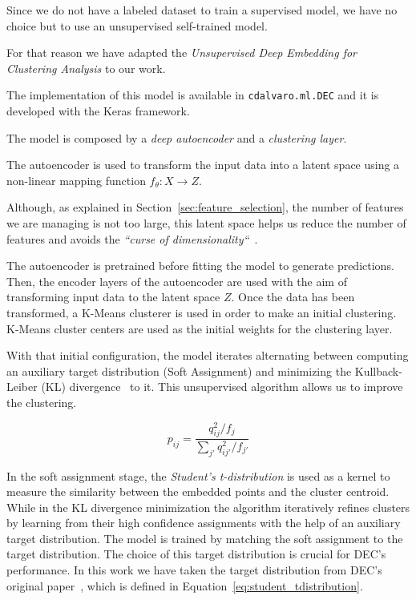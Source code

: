 \documentclass[11pt, a4paper, english]{book}
\begin{document}
Since we do not have a labeled dataset to train a supervised model,
we have no choice but to use an unsupervised self-trained model.

For that reason we have adapted the \emph{Unsupervised Deep Embedding for Clustering Analysis} to our work.

The implementation of this model is available in \verb|cdalvaro.ml.DEC|
and it is developed with the Keras framework.

The model is composed by a \emph{deep autoencoder} and a \emph{clustering layer}.

The autoencoder is used to transform the input data into a latent space
using a non-linear mapping function \(f_{\theta} : X \rightarrow Z\).

Although, as explained in Section~\ref{sec:feature_selection},
the number of features we are managing is not too large,
this latent space helps us reduce the number of features
and avoids the \emph{``curse of dimensionality``}~\cite{bellman1961curse}.

The autoencoder is pretrained before fitting the model to generate predictions. Then,
the encoder layers of the autoencoder are used with the aim of transforming input data to
the latent space \(Z\). Once the data has been transformed, a K-Means clusterer is used in
order to make an initial clustering. K-Means cluster centers are used as the initial
weights for the clustering layer.

With that initial configuration,
the model iterates alternating between computing an auxiliary target distribution (Soft Assignment)
and minimizing the Kullback-Leiber (KL) divergence~\cite{kullback1951information} to it.
This unsupervised algorithm allows us to improve the clustering.

\begin{equation}
  p_{ij} = \frac{q^{2}_{ij} / f_{j}}{\sum_{j'}q^{2}_{ij'}/f_{j'}}
  \label{eq:student_tdistribution}
\end{equation}

In the soft assignment stage,
the \emph{Student's t-distribution} is used as a kernel to measure the similarity
between the embedded points and the cluster centroid.
While in the KL divergence minimization the algorithm iteratively refines clusters by learning
from their high confidence assignments with the help of an auxiliary target distribution.
The model is trained by matching the soft assignment to the target distribution.
The choice of this target distribution is crucial for DEC's performance.
In this work we have taken the target distribution from DEC's original paper~\cite{xie2016unsupervised},
which is defined in Equation~\ref{eq:student_tdistribution}.
\end{document}
